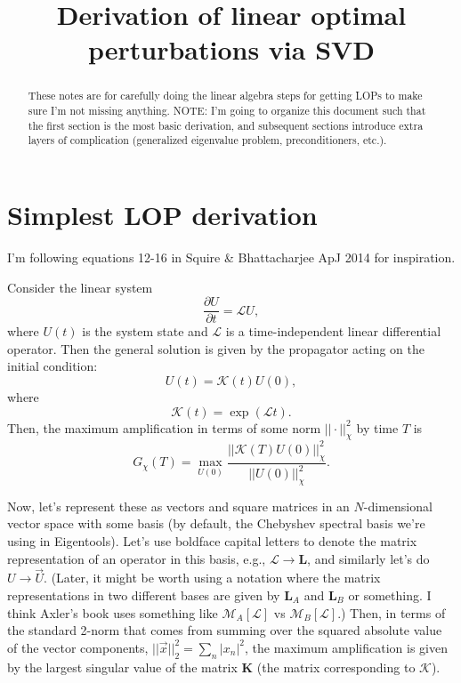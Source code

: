 \documentclass[aps,pop,preprint]{revtex4}
\begin{document}
\title{Derivation of linear optimal perturbations via SVD}
\begin{abstract}
These notes are for carefully doing the linear algebra steps for getting LOPs to make sure I'm not missing anything. 
NOTE: I'm going to organize this document such that the first section is the most basic derivation, and subsequent sections introduce extra layers of complication (generalized eigenvalue problem, preconditioners, etc.). 
\end{abstract}
\maketitle

\section{Simplest LOP derivation}
\label{sec:simplest}
I'm following equations 12-16 in Squire \& Bhattacharjee ApJ 2014 for inspiration.

Consider the linear system
\begin{equation}
\frac{\partial U}{\partial t} = \mathcal{L} U,
\label{eq:simplest_system}
\end{equation}
where $U(t)$ is the system state and $\mathcal{L}$ is a time-independent linear differential operator.  
Then the general solution is given by the propagator acting on the initial condition:
\begin{equation}
U(t) = \mathcal{K}(t) U(0),
\label{eq:simplest_solution}
\end{equation}
where
\begin{equation}
\mathcal{K}(t) = \exp(\mathcal{L} t).
\label{eq:simplest_propagator}
\end{equation}
Then, the maximum amplification in terms of some norm $|| \cdot ||_\chi^2$ by time $T$ is
\begin{equation}
G_\chi(T) = \max_{U(0)} \frac{|| \mathcal{K}(T) U(0) ||_\chi^2}{||U(0)||_\chi^2}.
\end{equation}

Now, let's represent these as vectors and square matrices in an $N$-dimensional vector space with some basis (by default, the Chebyshev spectral basis we're using in Eigentools). 
Let's use boldface capital letters to denote the matrix representation of an operator in this basis, e.g., $\mathcal{L} \to \mathbf{L}$, and similarly let's do $U \to \vec{U}$. 
(Later, it might be worth using a notation where the matrix representations in two different bases are given by $\mathbf{L}_A$ and $\mathbf{L}_B$ or something. I think Axler's book uses something like $\mathcal{M}_A[\mathcal{L}]$ vs $\mathcal{M}_B[\mathcal{L}]$.) 
Then, in terms of the standard 2-norm that comes from summing over the squared absolute value of the vector components, $||\vec{x}||_2^2 = \sum_n |x_n|^2$, the maximum amplification is given by the largest singular value of the matrix $\mathbf{K}$ (the matrix corresponding to $\mathcal{K}$).
\end{document}
